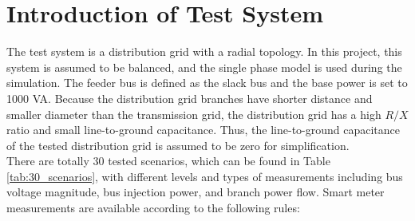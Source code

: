 \section{Introduction of Test System}
The test system is a distribution grid with a radial topology. In this project, this system is assumed to be balanced, and the single phase model is used during the simulation. The feeder bus is defined as the slack bus and the base power is set to 1000 VA. Because the distribution grid branches have shorter distance and smaller diameter than the transmission grid, the distribution grid has a high $R/X$ ratio and small line-to-ground capacitance. Thus, the line-to-ground capacitance of the tested distribution grid is assumed to be zero for simplification.
\bigskip
\\There are totally 30 tested scenarios, which can be found in Table \ref{tab:30_scenarios}, with different levels and types of measurements including bus voltage magnitude, bus injection power, and branch power flow. Smart meter measurements are available according to the following rules:
